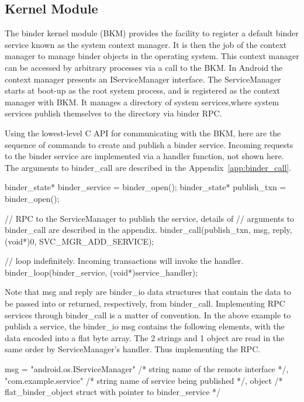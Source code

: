 \documentclass[prodmode]{acmlarge}
\begin{document}
\subsection{Kernel Module}
The binder kernel module (BKM) provides the facility to register a default binder service known as the system context manager. It is then the job of the context manager to manage binder objects in the operating system. This context manager can be accessed by arbitrary processes via a call to the BKM. In Android the context manager presents an IServiceManager interface. The ServiceManager starts at boot-up as the root system process, and is registered as the context manager with BKM. It manages a directory of system services,where system services publish themselves to the directory via binder RPC.

Using the lowest-level C API for communicating with the BKM, here are the sequence of commands to create and publish a binder service. Incoming requests to the binder service are implemented via a handler function, not shown here. The arguments to binder\_call are described in the Appendix~\ref{app:binder_call}.

\begin{snippet}[label=snip:binder_call,caption=binder\_call to publish a service with ServiceManager]
binder_state* binder_service = binder_open();
binder_state* publish_txn = binder_open();

// RPC to the ServiceManager to publish the  service, details of
// arguments to binder_call  are described in the appendix.
binder_call(publish_txn, msg, reply, (void*)0, SVC_MGR_ADD_SERVICE);

// loop indefinitely. Incoming transactions  will invoke the handler.
binder_loop(binder_service, (void*)service_handler);
\end{snippet}

Note that msg and reply are binder\_io data structures that contain the data to be passed into or returned, respectively, from binder\_call. Implementing RPC services through binder\_call is a matter of convention. In the above example to publish a service, the binder\_io msg contains the following elements, with the data encoded into a flat byte array. The 2 strings and 1 object are read in the same order by ServiceManager's handler. Thus implementing the RPC.

\begin{snippet}[caption=contents of msg passed into binder\_call]
msg = {
  "android.os.IServiceManager" /* string name of the remote interface */,
  "com.example.service" /* string name of service being published */,
  object /* flat_binder_object struct with pointer to binder_service */
}
\end{snippet}
\end{document}

